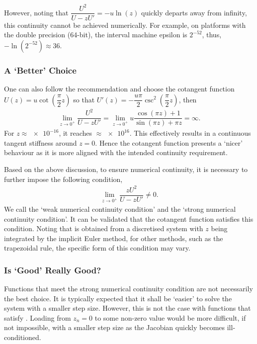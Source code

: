 However, noting that $\dfrac{U^2}{U-zU'}=-u\ln\left(z\right)$ quickly departs away from infinity, this continuity cannot be achieved numerically.
For example, on platforms with the double precision (64-bit), the interval machine epsilon is $2^{-52}$, thus, $-\ln\left(2^{-52}\right)\approx\num{36}$.
\subsubsection{A `Better' Choice}
One can also follow the recommendation and choose the cotangent function $U\left(z\right)=u\cot\left(\dfrac{\pi}{2}z\right)$ so that $U'\left(z\right)=-\dfrac{u\pi}{2}\csc^2\left(\dfrac{\pi}{2}z\right)$, then
\begin{gather}
    \lim\limits_{z\to0^+}\dfrac{U^2}{U-zU'}=\lim\limits_{z\to0^+}u\dfrac{\cos\left(\pi{}z\right)+1}{\sin\left(\pi{}z\right)+\pi{}z}=\infty.
\end{gather}
For $z\approx\num{e-16}$, it reaches $\approx\num{e16}$.
This effectively results in a continuous tangent stiffness around $z=0$.
Hence the cotangent function presents a `nicer' behaviour as it is more aligned with the intended continuity requirement.

Based on the above discussion, to ensure numerical continuity, it is necessary to further impose the following condition,
\begin{gather}\label{eq:continuity}
    \lim\limits_{z\to0^+}\dfrac{zU^2}{U-zU'}\neq0.
\end{gather}
We call  the `weak numerical continuity condition' and  the `strong numerical continuity condition'.
It can be validated that the cotangent function satisfies this condition.
Noting that  is obtained from a discretised system with $z$ being integrated by the implicit Euler method, for other methods, such as the trapezoidal rule, the specific form of this condition may vary.
\subsubsection{Is `Good' Really Good?}
Functions that meet the strong numerical continuity condition are not necessarily the best choice.
It is typically expected that it shall be `easier' to solve the system with a smaller step size.
However, this is not the case with functions that satisfy .
Loading from $z_n=0$ to some non-zero value would be more difficult, if not impossible, with a smaller step size as the Jacobian quickly becomes ill-conditioned.

